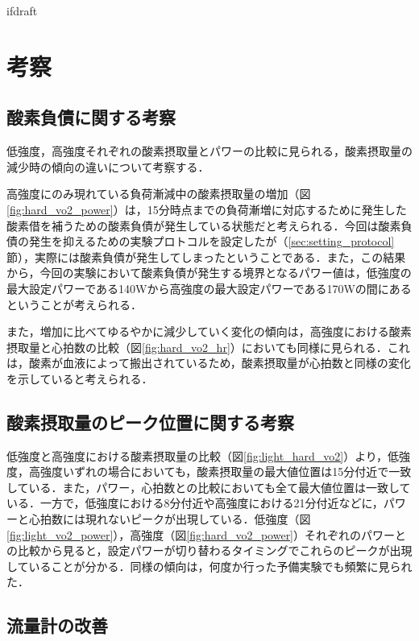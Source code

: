 \expandafter\ifx\csname ifdraft\endcsname\relax
 
\fi

\section{考察}

\subsection{酸素負債に関する考察}

低強度，高強度それぞれの酸素摂取量とパワーの比較に見られる，酸素摂取量の減少時の傾向の違いについて考察する．

高強度にのみ現れている負荷漸減中の酸素摂取量の増加（図\ref{fig:hard_vo2_power}）は，15分時点までの負荷漸増に対応するために発生した酸素借を補うための酸素負債が発生している状態だと考えられる．今回は酸素負債の発生を抑えるための実験プロトコルを設定したが（\ref{sec:setting_protocol}節），実際には酸素負債が発生してしまったということである．また，この結果から，今回の実験において酸素負債が発生する境界となるパワー値は，低強度の最大設定パワーである140Wから高強度の最大設定パワーである170Wの間にあるということが考えられる．

また，増加に比べてゆるやかに減少していく変化の傾向は，高強度における酸素摂取量と心拍数の比較（図\ref{fig:hard_vo2_hr}）においても同様に見られる．これは，酸素が血液によって搬出されているため，酸素摂取量が心拍数と同様の変化を示していると考えられる．

\subsection{酸素摂取量のピーク位置に関する考察}

低強度と高強度における酸素摂取量の比較（図\ref{fig:light_hard_vo2}）より，低強度，高強度いずれの場合においても，酸素摂取量の最大値位置は15分付近で一致している．また，パワー，心拍数との比較においても全て最大値位置は一致している．一方で，低強度における8分付近や高強度における21分付近などに，パワーと心拍数には現れないピークが出現している．低強度（図\ref{fig:light_vo2_power}），高強度（図\ref{fig:hard_vo2_power}）それぞれのパワーとの比較から見ると，設定パワーが切り替わるタイミングでこれらのピークが出現していることが分かる．同様の傾向は，何度か行った予備実験でも頻繁に見られた．

\subsection{流量計の改善}

